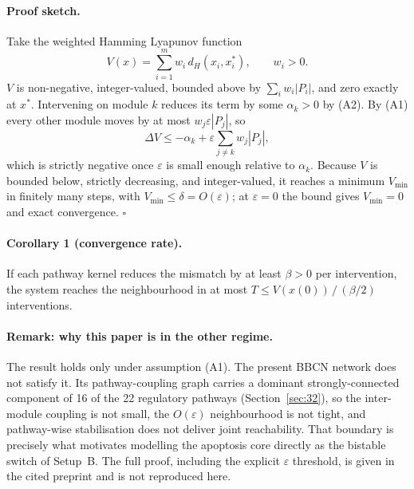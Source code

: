 \paragraph{Proof sketch.} Take the weighted Hamming Lyapunov function
\[
V(x)=\sum_{i=1}^{m} w_i\, d_H\!\left(x_i,x_i^{*}\right),\qquad w_i>0 .
\]
$V$ is non-negative, integer-valued, bounded above by $\sum_i w_i|P_i|$, and zero exactly at $x^{*}$.
Intervening on module $k$ reduces its term by some $\alpha_k>0$ by (A2). By (A1) every other module
moves by at most $w_j\varepsilon|P_j|$, so
\[
\Delta V \le -\alpha_k + \varepsilon\sum_{j\neq k} w_j|P_j| ,
\]
which is strictly negative once $\varepsilon$ is small enough relative to $\alpha_k$. Because $V$ is
bounded below, strictly decreasing, and integer-valued, it reaches a minimum $V_{\min}$ in finitely
many steps, with $V_{\min}\le\delta=O(\varepsilon)$; at $\varepsilon=0$ the bound gives $V_{\min}=0$
and exact convergence. \hfill$\square$

\paragraph{Corollary 1 (convergence rate).} If each pathway kernel reduces the mismatch by at least
$\beta>0$ per intervention, the system reaches the neighbourhood in at most $T \le V(x(0))\,/\,(\beta/2)$
interventions.

\paragraph{Remark: why this paper is in the other regime.} The result holds only under assumption
(A1). The present BBCN network does not satisfy it. Its pathway-coupling graph carries a dominant
strongly-connected component of 16 of the 22 regulatory pathways (Section~\ref{sec:32}), so the
inter-module coupling is not small, the $O(\varepsilon)$ neighbourhood is not tight, and pathway-wise
stabilisation does not deliver joint reachability. That boundary is precisely what motivates modelling
the apoptosis core directly as the bistable switch of Setup~B. The full proof, including the explicit
$\varepsilon$ threshold, is given in the cited preprint and is not reproduced here.
